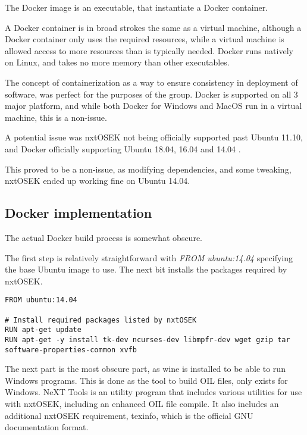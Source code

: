 The Docker image is an executable, that instantiate a Docker container.

A Docker container is in broad strokes the same as a virtual machine, although a Docker container only uses the required resources, while a virtual machine is allowed access to more resources than is typically needed.
Docker runs natively on Linux, and takes no more memory than other executables.

The concept of containerization as a way to ensure consistency in deployment of software, was perfect for the purposes of the group.
Docker is supported on all 3 major platform, and while both Docker for Windows and MacOS run in a virtual machine, this is a non-issue.

A potential issue was nxtOSEK not being officially supported past Ubuntu 11.10, and Docker officially supporting Ubuntu 18.04, 16.04 and 14.04 \cite{dockerubuntu}.

This proved to be a non-issue, as modifying dependencies, and some tweaking, nxtOSEK ended up working fine on Ubuntu 14.04.

\subsection{Docker implementation}\label{subsec:dockerimplementation}
The actual Docker build process is somewhat obscure.

The first step is relatively straightforward with \textit{FROM ubuntu:14.04} specifying the base Ubuntu image to use.
The next bit installs the packages required by nxtOSEK.
\begin{lstlisting}[language=docker,label={lst:dockerimplementation1},caption={Version definition and installation of packages required by nxtOSEK}]
FROM ubuntu:14.04

# Install required packages listed by nxtOSEK
RUN apt-get update
RUN apt-get -y install tk-dev ncurses-dev libmpfr-dev wget gzip tar software-properties-common xvfb
\end{lstlisting}

The next part is the most obscure part, as wine is installed to be able to run Windows programs.
This is done as the tool to build OIL files, only exists for Windows.
NeXT Tools is an utility program that includes various utilities for use with nxtOSEK, including an enhanced OIL file compile\cite{nxttool}.
It also includes an additional nxtOSEK requirement, texinfo, which is the official GNU documentation format\cite{texinfo}.

